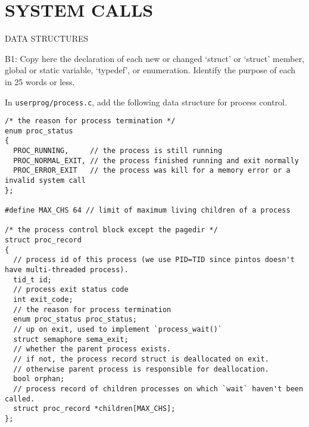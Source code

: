 \section{SYSTEM CALLS}
\begin{aspect}{DATA STRUCTURES}
	\begin{qc}
		B1: Copy here the declaration of each new or changed
		`struct' or `struct' member, global or static variable, `typedef', or enumeration.
		Identify the purpose of each in 25 words or less.
	\end{qc}
	\begin{tcolorbox}[title=for process control]
		In \lstinline{userprog/process.c}, add the following data structure for process control.
		\begin{lstlisting}
/* the reason for process termination */
enum proc_status
{
  PROC_RUNNING,     // the process is still running
  PROC_NORMAL_EXIT, // the process finished running and exit normally
  PROC_ERROR_EXIT   // the process was kill for a memory error or a invalid system call
};

#define MAX_CHS 64 // limit of maximum living children of a process

/* the process control block except the pagedir */
struct proc_record
{
  // process id of this process (we use PID=TID since pintos doesn't have multi-threaded process).
  tid_t id;                              
  // process exit status code
  int exit_code;                         
  // the reason for process termination
  enum proc_status proc_status;          
  // up on exit, used to implement `process_wait()`
  struct semaphore sema_exit;            
  // whether the parent process exists.
  // if not, the process record struct is deallocated on exit.
  // otherwise parent process is responsible for deallocation.
  bool orphan;                           
  // process record of children processes on which `wait` haven't been called.
  struct proc_record *children[MAX_CHS]; 
};
		\end{lstlisting}
	\end{tcolorbox}


\end{aspect}

